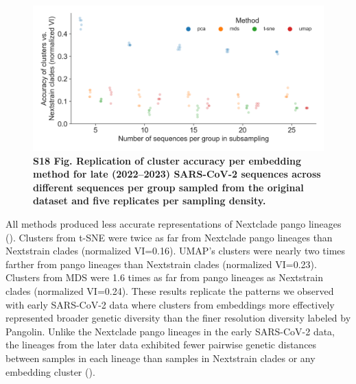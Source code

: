 \documentclass[10pt,letterpaper]{article}
\begin{document}
\begin{figure}[!h]
\includegraphics[width=\columnwidth]{figures/sarscov2-test-replication-of-cluster-accuracy.png}
\caption*{{\bf S18 Fig. Replication of cluster accuracy per embedding method for late (2022--2023) SARS-CoV-2 sequences across different sequences per group sampled from the original dataset and five replicates per sampling density.}}
\end{figure}

All methods produced less accurate representations of Nextclade pango lineages ().
Clusters from t-SNE were twice as far from Nextclade pango lineages than Nextstrain clades (normalized VI=0.16).
UMAP's clusters were nearly two times farther from pango lineages than Nextstrain clades (normalized VI=0.23).
Clusters from MDS were 1.6 times as far from pango lineages as Nextstrain clades (normalized VI=0.24).
These results replicate the patterns we observed with early SARS-CoV-2 data where clusters from embeddings more effectively represented broader genetic diversity than the finer resolution diversity labeled by Pangolin.
Unlike the Nextclade pango lineages in the early SARS-CoV-2 data, the lineages from the later data exhibited fewer pairwise genetic distances between samples in each lineage than samples in Nextstrain clades or any embedding cluster ().
\end{document}
